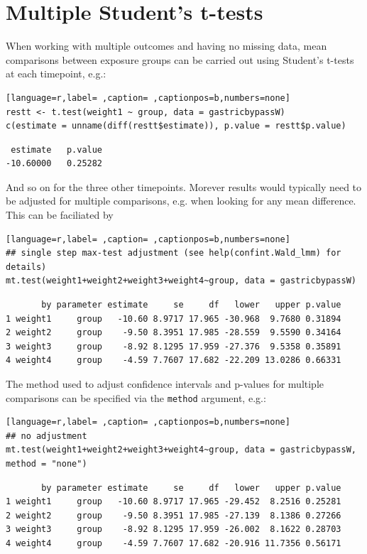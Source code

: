\documentclass[12pt]{article}
\begin{document}
\clearpage

\section{Multiple Student's t-tests}
\label{sec:org275cd7c}

When working with multiple outcomes and having no missing data, mean
comparisons between exposure groups can be carried out using Student's
t-tests at each timepoint, e.g.:
\begin{lstlisting}[language=r,label= ,caption= ,captionpos=b,numbers=none]
restt <- t.test(weight1 ~ group, data = gastricbypassW)
c(estimate = unname(diff(restt$estimate)), p.value = restt$p.value)
\end{lstlisting}

\begin{verbatim}
 estimate   p.value 
-10.60000   0.25282
\end{verbatim}


And so on for the three other timepoints. Morever results would
typically need to be adjusted for multiple comparisons, e.g. when
looking for any mean difference. This can be faciliated by
\begin{lstlisting}[language=r,label= ,caption= ,captionpos=b,numbers=none]
## single step max-test adjustment (see help(confint.Wald_lmm) for details)
mt.test(weight1+weight2+weight3+weight4~group, data = gastricbypassW)
\end{lstlisting}

\begin{verbatim}
       by parameter estimate     se     df   lower   upper p.value
1 weight1     group   -10.60 8.9717 17.965 -30.968  9.7680 0.31894
2 weight2     group    -9.50 8.3951 17.985 -28.559  9.5590 0.34164
3 weight3     group    -8.92 8.1295 17.959 -27.376  9.5358 0.35891
4 weight4     group    -4.59 7.7607 17.682 -22.209 13.0286 0.66331
\end{verbatim}


The method used to adjust confidence intervals and p-values for
multiple comparisons can be specified via the \texttt{method} argument, e.g.:
\begin{lstlisting}[language=r,label= ,caption= ,captionpos=b,numbers=none]
## no adjustment
mt.test(weight1+weight2+weight3+weight4~group, data = gastricbypassW, method = "none")
\end{lstlisting}

\begin{verbatim}
       by parameter estimate     se     df   lower   upper p.value
1 weight1     group   -10.60 8.9717 17.965 -29.452  8.2516 0.25281
2 weight2     group    -9.50 8.3951 17.985 -27.139  8.1386 0.27266
3 weight3     group    -8.92 8.1295 17.959 -26.002  8.1622 0.28703
4 weight4     group    -4.59 7.7607 17.682 -20.916 11.7356 0.56171
\end{verbatim}
\end{document}
